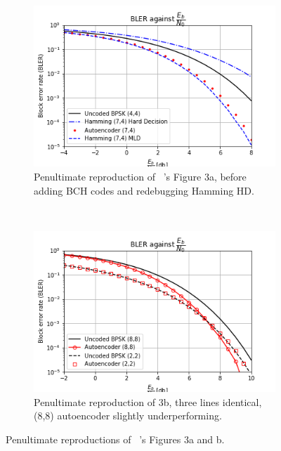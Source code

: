 \documentclass[12pt,onecolumn,letterpaper]{article}
\begin{document}
\begin{figure}[t!]
   \centering
   \begin{subfigure}[t]{0.45\textwidth}
       \centering
       \includegraphics[width=\linewidth]{figures/o_shea_3a_bler_vs_eb.png}
       \caption{Penultimate reproduction of ~\cite{oShea}'s Figure 3a, before adding BCH codes and redebugging Hamming HD.}
       \label{fig:OSheaFigure3a}
   \end{subfigure}
   ~
   \begin{subfigure}[t]{0.45\textwidth}
       \centering
       \includegraphics[width=\linewidth]{figures/o_shea_3b_bler_vs_eb.png}
       \caption{Penultimate reproduction of 3b, three lines identical, (8,8) autoencoder slightly underperforming.}
       \label{fig:OSheaFigure3b}
   \end{subfigure}
   \caption{Penultimate reproductions of ~\cite{oShea}'s Figures 3a and b.}
   \label{fig:OSheaFig3}
\end{figure}
\end{document}
